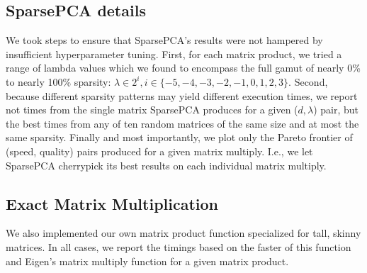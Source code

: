 \begin{itemize}
\end{itemize}



\subsection{SparsePCA details}

We took steps to ensure that SparsePCA's results were not hampered by insufficient hyperparameter tuning. First, for each matrix product, we tried a range of lambda values which we found to encompass the full gamut of nearly 0\% to nearly 100\% sparsity: $\lambda \in 2^i, i \in \{-5, -4, -3, -2, -1, 0, 1, 2, 3\}$. Second, because different sparsity patterns may yield different execution times, we report not times from the single matrix SparsePCA produces for a given ($d, \lambda$) pair, but the best times from any of ten random matrices of the same size and at most the same sparsity. Finally and most importantly, we plot only the Pareto frontier of (speed, quality) pairs produced for a given matrix multiply. I.e., we let SparsePCA cherrypick its best results on each individual matrix multiply.

\subsection{Exact Matrix Multiplication}

We also implemented our own matrix product function specialized for tall, skinny matrices. In all cases, we report the timings based on the faster of this function and Eigen's \cite{eigen} matrix multiply function for a given matrix product.

